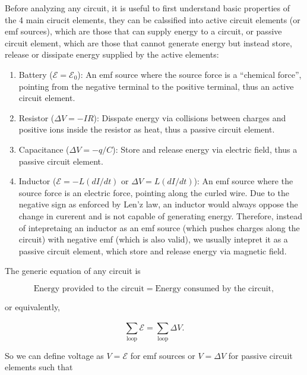\documentclass[english,a4paper,12pt]{report}
\begin{document}
Before analyzing any circuit, it is useful to first understand basic properties of the 4 main cirucit elements, they can be calssified into active circuit elements (or emf sources), which are those that can supply energy to a circuit, or passive circuit element, which are those that cannot generate energy but instead store, release or dissipate energy supplied by the active elements:

\begin{enumerate}
    \item Battery (\(\mathcal{E} = \mathcal{E}_{0} \)): An emf source where the source force is a ``chemical force'', pointing from the negative terminal to the positive terminal, thus an active circuit element.
    \item Resistor (\(\Delta V = -IR\)): Disspate energy via collisions between charges and positive ions inside the resistor as heat, thus a passive circuit element.
    \item Capacitance (\(\Delta V = -q /C \)): Store and release energy via electric field, thus a passive circuit element.
    \item Inductor (\(\mathcal{E} = -L(dI /dt) \text { or } \Delta V = L(dI /dt)\)): An emf source where the source force is an electric force, pointing along the curled wire. Due to the negative sign as enforced by Len'z law, an inductor would always oppose the change in curerent and is not capable of generating energy. Therefore, instead of intepretaing an inductor as an emf source (which pushes charges along the circuit) with negative emf (which is also valid), we usually intepret it as a passive circuit element, which store and release energy via magnetic field.   
\end{enumerate}

The generic equation of any circuit is 

\begin{equation}
    \text{Energy provided to the circuit} = \text{Energy consumed by the circuit},
\end{equation}

or equivalently, 

\begin{equation} \label{energycircuit} 
    \sum_{\text{loop} }^{} \mathcal{E} = \sum_{\text{loop} }^{} \Delta V. 
\end{equation}

So we can define voltage as \(V = \mathcal{E}\) for emf sources or \(V = \Delta V\) for passive circuit elements such that 
\end{document}
